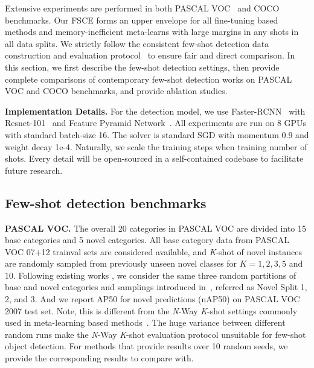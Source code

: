 \documentclass[final]{cvpr}
\begin{document}
Extensive experiments are performed in both PASCAL VOC~\cite{voc07, voc12} and COCO~\cite{coco} benchmarks. Our FSCE forms an upper envelope for all fine-tuning based methods and memory-inefficient meta-learns with large margins in any shots in all data splits. We strictly follow the consistent few-shot detection data construction and evaluation protocol~\cite{kang_few-shot_2019,wang_frustratingly_2020,wu_multi-scale_2020,xiao_few_shot_2020} to ensure fair and direct comparison. In this section, we first describe the few-shot detection settings, then provide complete comparisons of contemporary few-shot detection works on PASCAL VOC and COCO benchmarks, and provide ablation studies.

\textbf{Implementation Details.} For the detection model, we use Faster-RCNN~\cite{ren_faster_2016} with Resnet-101~\cite{he_deep_2015} and Feature Pyramid Network~\cite{lin_feature_2017}. All experiments are run on 8 GPUs with standard batch-size 16. The solver is standard SGD with momentum 0.9 and weight decay 1e-4. Naturally, we scale the training steps when training number of shots. Every detail will be open-sourced in a self-contained codebase to facilitate future research.

\subsection{Few-shot detection benchmarks}\label{sec41}
\vspace{-2.5mm}
\textbf{PASCAL VOC.} The overall 20 categories in PASCAL VOC are divided into 15 base categories and 5 novel categories. All base category data from PASCAL VOC 07+12 trainval sets are considered available, and \textit{K}-shot of novel instances are randomly sampled from previously unseen novel classes for $K=1,2,3,5$ and $10$. Following existing works \cite{wang_frustratingly_2020,kang_few-shot_2019,xiao_few_shot_2020}, we consider the same three random partitions of base and novel categories and samplings introduced in~\cite{kang_few-shot_2019}, referred as Novel Split 1, 2, and 3. And we report AP50 for novel predictions (nAP50) on PASCAL VOC 2007 test set. Note, this is different from the \textit{N}-Way \textit{K}-shot settings commonly used in meta-learning based methods~\cite{karlinsky_repmet_2018}. The huge variance between different random runs make the \textit{N}-Way \textit{K}-shot evaluation protocol unsuitable for few-shot object detection. For methods that provide results over 10 random seeds, we provide the corresponding results to compare with. 
\end{document}
